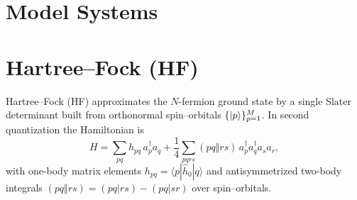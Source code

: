 \section{Model Systems}



\section{Hartree--Fock (HF)}

Hartree--Fock (HF) approximates the $N$-fermion ground state by a single Slater determinant
built from orthonormal spin–orbitals $\{\ket{p}\}_{p=1}^M$. In second quantization the
Hamiltonian is
\[
H=\sum_{pq} h_{pq}\, a_p^\dagger a_q
  + \frac{1}{4}\sum_{pqrs} (pq\Vert rs)\, a_p^\dagger a_q^\dagger a_s a_r,
\]
with one-body matrix elements $h_{pq}=\langle p|\hat h_0|q\rangle$ and antisymmetrized
two-body integrals $(pq\Vert rs)=(pq|rs)-(pq|sr)$ over spin–orbitals.

